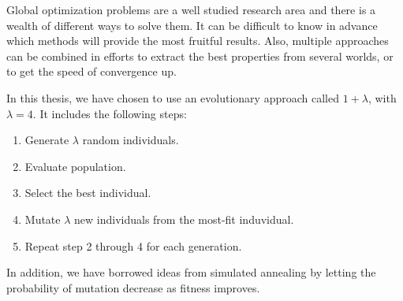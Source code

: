 Global optimization problems are a well studied research area and there is a
wealth of different ways to solve them. It can be difficult to know in advance
which methods will provide the most fruitful results. Also, multiple approaches
can be combined in efforts to extract the best properties from several worlds,
or to get the speed of convergence up.

In this thesis, we have chosen to use an evolutionary approach called $1 +
\lambda$, with $\lambda = 4$. It includes the following steps:

\begin{enumerate}
    \item Generate $\lambda$ random individuals.
    \item Evaluate population.
    \item Select the best individual.
    \item Mutate $\lambda$ new individuals from the most-fit induvidual.
    \item Repeat step 2 through 4 for each generation.
\end{enumerate}

In addition, we have borrowed ideas from simulated annealing by letting the
probability of mutation decrease as fitness improves.
